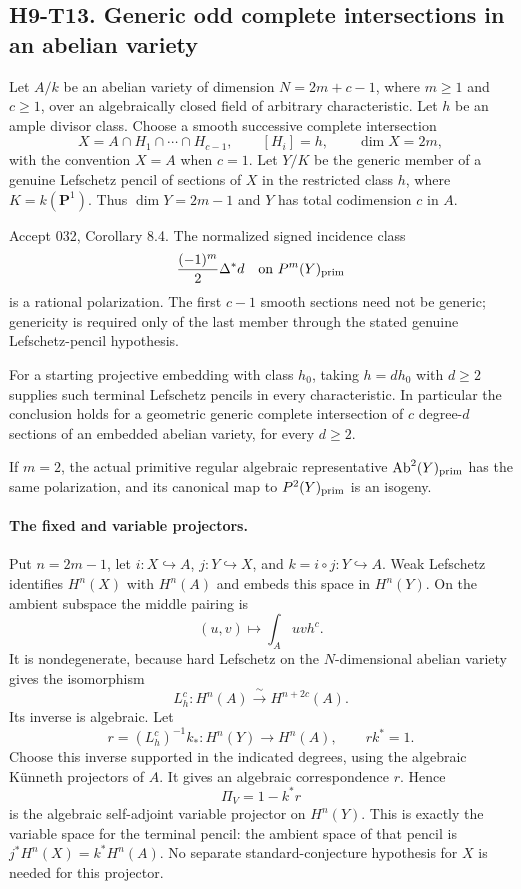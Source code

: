 
\subsection*{H9-T13. Generic odd complete intersections in an abelian variety}

\begin{theorem}[H9-T13]
Let $A/k$ be an abelian variety of dimension
$N=2m+c-1$, where $m\ge1$ and $c\ge1$, over an algebraically closed
field of arbitrary characteristic. Let $h$ be an ample divisor class.
Choose a smooth successive complete intersection
\[
 X=A\cap H_1\cap\cdots\cap H_{c-1},\qquad [H_i]=h,
 \qquad \dim X=2m,
\]
with the convention $X=A$ when $c=1$. Let $Y/K$ be the generic member
of a genuine Lefschetz pencil of sections of $X$ in the restricted
class $h$, where $K=k(\mathbf P^1)$. Thus
$\dim Y=2m-1$ and $Y$ has total codimension $c$ in $A$.

Accept 032, Corollary 8.4. The normalized signed incidence class
\[
 \frac{(-1)^m}{2}\Delta^*d
       \quad\text{on }P^m(Y)_{\rm prim}
\]
is a rational polarization. The first $c-1$ smooth sections need not
be generic; genericity is required only of the last member through
the stated genuine Lefschetz-pencil hypothesis.

For a starting projective embedding with class $h_0$, taking
$h=d h_0$ with $d\ge2$ supplies such terminal Lefschetz pencils in
every characteristic. In particular the conclusion holds for a
geometric generic complete intersection of $c$ degree-$d$ sections
of an embedded abelian variety, for every $d\ge2$.

If $m=2$, the actual primitive regular algebraic representative
$\operatorname{Ab}^2(Y)_{\rm prim}$ has the same polarization, and
its canonical map to $P^2(Y)_{\rm prim}$ is an isogeny.
\end{theorem}

\paragraph{The fixed and variable projectors.}
Put $n=2m-1$, let $i:X\hookrightarrow A$, $j:Y\hookrightarrow X$,
and $k=i\circ j:Y\hookrightarrow A$. Weak Lefschetz identifies
$H^n(X)$ with $H^n(A)$ and embeds this space in $H^n(Y)$.
On the ambient subspace the middle pairing is
\[
 (u,v)\longmapsto\int_Auvh^c.
\]
It is nondegenerate, because hard Lefschetz on the $N$-dimensional
abelian variety gives the isomorphism
\[
 L_h^c:H^n(A)\xrightarrow{\ \sim\ }H^{n+2c}(A).
\]
Its inverse is algebraic. Let
\[
 r=(L_h^c)^{-1}k_*:H^n(Y)\longrightarrow H^n(A),
 \qquad r k^*=1.
\]
Choose this inverse supported in the indicated degrees, using the
algebraic K\"unneth projectors of $A$. It gives an algebraic
correspondence $r$. Hence
\[
 \Pi_V=1-k^*r
\]
is the algebraic self-adjoint variable projector on $H^n(Y)$.
This is exactly the variable space for the terminal pencil: the
ambient space of that pencil is $j^*H^n(X)=k^*H^n(A)$.
No separate standard-conjecture hypothesis for $X$ is needed for this
projector.

